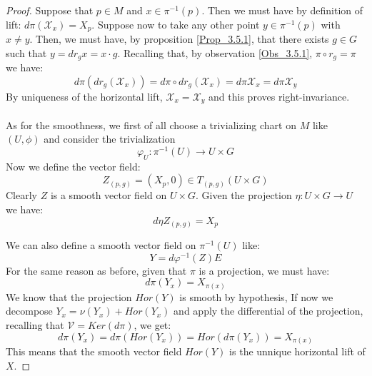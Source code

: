 \documentclass[12pt,a4paper]{report}
\theoremstyle{definition}
\theoremstyle{Theorem}
\theoremstyle{definition}
\theoremstyle{definition}
\begin{document}
		\begin{proof}
			Suppose that $p\in M$ and $x\in\pi^{-1}(p)$. Then we must have by definition of lift: $d\pi(\mathcal{X}_{x})=X_p$. Suppose now to take any other point $y\in\pi^{-1}(p)$ with $x\neq y$. Then, we must have, by proposition \ref{Prop_3.5.1}, that there exists $g\in G$ such that $y=dr_{g}x=x\cdot g$. Recalling that, by observation \ref{Obs_3.5.1}, $\pi\circ r_{g}=\pi$ we have:
			$$d\pi(dr_{g}(\mathcal{X}_{x}))=d\pi\circ dr_{g}(\mathcal{X}_{x})=d\pi\mathcal{X}_{x}=d\pi\mathcal{X}_{y}$$
			By uniqueness of the horizontal lift, $\mathcal{X}_{x}=\mathcal{X}_{y}$ and this proves right-invariance.\\
			\\
			As for the smoothness, we first of all choose a trivializing chart on $M$ like $(U,\phi)$ and consider the trivialization 
			$$\varphi_U:\pi^{-1}(U)\rightarrow U\times G$$
			Now we define the vector field:
			$$Z_{(p,g)}=(X_p,0)\in T_{(p,g)}(U\times G)$$
			Clearly $Z$ is a smooth vector field on $U\times G$. Given the projection $\eta:U\times G\rightarrow U$ we have:
			$$d\eta Z_{(p,g)}=X_p$$
			\begin{comment}
			To see this, note that $d\eta:T(U\times G)\rightarrow TU$ and so we get: $d\eta(Z)\in TU$ is a vector field. In particular, by definition of differential, we must have for any $(p,g)\in U\times G$:
			$$d\eta_{(p,g)}(Z_{(p,g)})f=Z_{(p,g)}(f\circ \eta_{(p,g)})$$
			And since $\eta$ projects the points from $U\times G$ to $U$, we get:
			$$d\eta_{(p,g)}(Z_{(p,g)})=X_p$$
			\end{comment}
			We can also define a smooth vector field on $\pi^{-1}(U)$ like:
			$$Y=d\varphi^{-1}(Z)E$$
			For the same reason as before, given that $\pi$ is a projection, we must have:
			$$d\pi(Y_{x})=X_{\pi(x)}$$
			We know that the projection $Hor(Y)$ is smooth by hypothesis, If now we decompose $Y_{x}=\nu(Y_{x})+Hor(Y_{x})$ and apply the differential of the projection, recalling that $\mathcal{V}=Ker(d\pi)$, we get:
			$$d\pi(Y_{x})=d\pi(Hor(Y_{x}))=Hor(d\pi(Y_{x}))=X_{\pi(x)}$$
			This means that the smooth vector field $Hor(Y)$ is the unnique horizontal lift of $X$.
		\end{proof}
\end{document}
